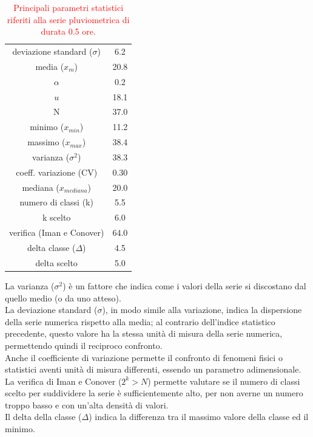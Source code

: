 \begin{table}[H] \centering
    \caption{\textcolor{red}{Principali parametri statistici riferiti alla serie pluviometrica di durata 0.5 ore.}}
 \begin{tabular}{cc}
    \toprule
deviazione standard ($\sigma$) & 6.2  \\
media ($x_m$)              & 20.8 \\
$\alpha$            & 0.2  \\
$u$           & 18.1\\
N                & 37.0 \\
minimo ($x_{min}$)             & 11.2 \\
massimo ($x_{max}$)            & 38.4 \\
varianza ($\sigma^2$)             & 38.3 \\
coeff. variazione (CV)    & 0.30 \\
mediana ($x_{mediana}$)        & 20.0 \\
numero di classi (k)      & 5.5  \\
k scelto                 & 6.0  \\
verifica (Iman e Conover) & 64.0 \\
delta classe ($\Delta$)          & 4.5  \\
delta scelto             & 5.0 \\
        \bottomrule
        \end{tabular}
\end{table}    

La varianza ($\sigma ^2$) è un fattore che indica come i valori della serie si discostano dal quello medio (o da uno atteso).\\
La deviazione standard ($\sigma$), in modo simile alla variazione, indica la dispersione della serie numerica rispetto alla media; al contrario dell'indice statistico precedente, questo valore ha la stessa unità di misura della serie numerica, permettendo quindi il reciproco confronto.\\
Anche il coefficiente di variazione permette il confronto di fenomeni fisici o statistici aventi unità di misura differenti, essendo un parametro adimensionale.\\
La verifica di Iman e Conover ($2^k>N$) permette valutare se il numero di classi scelto per suddividere la serie è sufficientemente alto, per non averne un numero troppo basso e con un'alta densità di valori.\\
Il delta della classe ($\Delta$) indica la differenza tra il massimo valore della classe ed il minimo.

